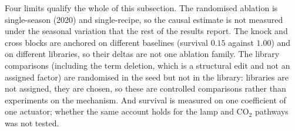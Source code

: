Four limits qualify the whole of this subsection. The randomised ablation is
single-season (2020) and single-recipe, so the causal estimate is not measured under the
seasonal variation that the rest of the results report. The knock and cross blocks are
anchored on different baselines (survival $0.15$ against $1.00$) and on different
libraries, so their deltas are not one ablation family. The library comparisons (including the term deletion, which is a structural edit and not an assigned factor) are randomised in the seed but not in the library: libraries are not assigned, they are
chosen, so these are controlled comparisons rather than experiments on the mechanism.
And survival is measured on one coefficient of one actuator; whether the same account
holds for the lamp and CO$_2$ pathways was not tested.

